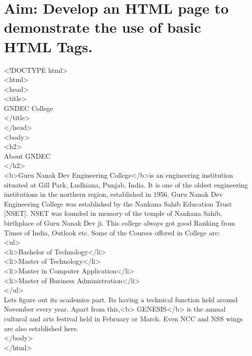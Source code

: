 
\section*{\fontsize{16}{14}\selectfont Aim: Develop an HTML page to demonstrate the use of basic HTML Tags.}


<!DOCTYPE html>\\
<html>\\
<head>\\
<title>\\
GNDEC College\\
</title>\\
</head>\\
<body>\\
<h2>\\
About GNDEC\\
</h2>\\
<b>Guru Nanak Dev Engineering College</b>is an engineering institution situated at Gill Park, Ludhiana, Punjab, India. It is one of the oldest engineering institutions in the northern region, established in 1956.
Guru Nanak Dev Engineering College was established by the Nankana Sahib Education Trust [NSET].
NSET was founded in memory of the temple of Nankana Sahib, birthplace of Guru Nanak Dev ji.
This college always got good Ranking from Times of India, Outlook etc.
Some of the Courses offered in College are:\\
<ul>\\
<li>Bachelor of Technology</li>\\
<li>Master of Technology</li>\\
<li>Master in Computer Application</li>\\
<li>Master of Business Administration</li>\\
</ul>\\
Lets figure out its academics part.
Its having a technical function held around November every year. Apart from this,<b> GENESIS</b> is the annual cultural and arts festival held in February or March.
Even NCC and NSS wings are also established here.\\
</body>\\
</html>

